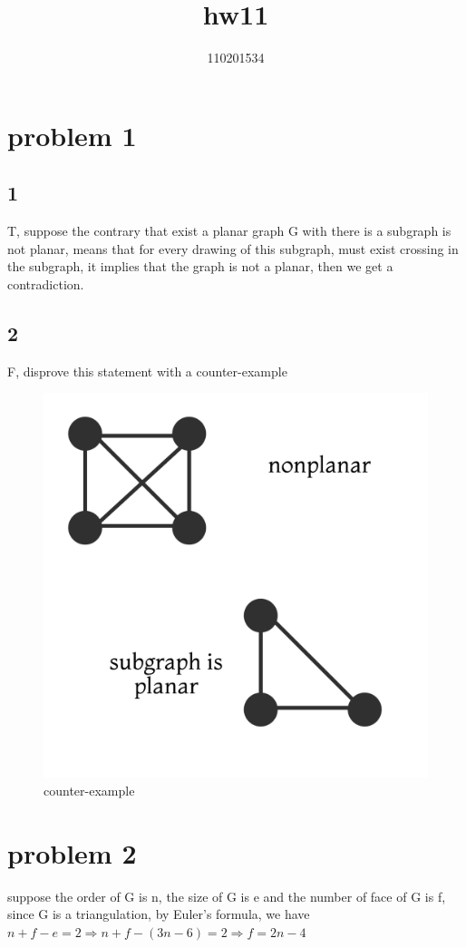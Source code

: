\documentclass{article}
\title{hw11}
\author{110201534}
\date{}
\begin{document}
\begin{CJK*}{UTF8}{bkai}
\maketitle

\section*{problem 1}
\subsection*{1}T, suppose the contrary that exist a planar graph G with there is a subgraph is not planar, means that for every drawing of this subgraph, must exist crossing in the subgraph, it implies that the graph is not a planar, then we get a contradiction.
\subsection*{2}F, disprove this statement with a counter-example
\begin{figure}[H]
    \centering
    \includegraphics[scale = 0.1]{counterexample.jpg}
    \caption{counter-example}
\end{figure}
\section*{problem 2}
suppose the order of G is n, the size of G is e and the number of face of G is f, since G is a triangulation, 
by Euler's formula, we have $n+f-e=2 \Rightarrow n + f - (3n-6)=2 \Rightarrow f = 2n-4$


\end{CJK*}
\end{document}
